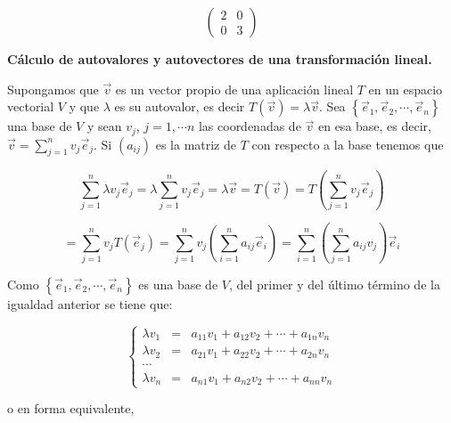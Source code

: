 $$\left(\begin{array}{cc}  2 & 0  \\ 0 &  3
\end{array}
 \right)$$
 
\bigskip


\noindent
\textbf{Cálculo de  autovalores y autovectores de una transformación lineal.}

\bigskip

Supongamos que $\vec{v}$ es un vector propio de una aplicación lineal $T$ en un espacio vectorial $V$ y que $\lambda$ es su autovalor, es decir $T(\vec{v})=\lambda \vec{v}$. Sea $\left\{\vec{e}_1,\vec{e}_2, \cdots,\vec{e}_n\right\}$ una base de $V$ y  sean   $v_{j}$, $ j=1,\cdots n $ las coordenadas de  $\vec{v}$ en esa base, es decir,  $\vec{v}=\sum_{j=1}^{n}v_{j}\vec{e}_j$. Si $(a_{ij})$ es la matriz 
de $T$ con respecto a la base tenemos que 


$$\sum_{j=1}^{n} \lambda v_{j}\vec{e}_j = \lambda \sum_{j=1}^{n}  v_{j}\vec{e}_j = \lambda \vec{v}=T(\vec{v})=T(\sum_{j=1}^{n}  v_{j}\vec{e}_j) $$


\bigskip


$$ =\sum_{j=1}^{n}  v_{j} T(\vec{e}_j )= \sum_{j=1}^{n}  v_{j}  (\sum_{i=1}^{n}  a_{ij}\vec{e}_i)=  \sum_{i=1}^{n}   (\sum_{j=1}^{n}  a_{ij} v_{j})\vec{e}_i $$

\bigskip

Como $\left\{\vec{e}_1,\vec{e}_2, \cdots,\vec{e}_n\right\}$ es una base de $V$, del primer y del último término de la igualdad anterior se tiene que: 

\bigskip

\begin{equation} \label{matriz A0}
\left\{ \begin{array} {ccl} 
                    \lambda v_1&=&a_{11}v_1+a_{12}v_2+\cdots +a_{1n}v_n    \\
                    \lambda v_2&=&a_{21}v_1+a_{22}v_2+\cdots +a_{2n}v_n  \\
										\cdots  \\
                    \lambda v_n&=&a_{n1}v_1+a_{n2}v_2+\cdots +a_{nn}v_n  
                   \end{array}
           \right.
\end{equation}

\bigskip

\noindent
o en forma equivalente,

\bigskip

